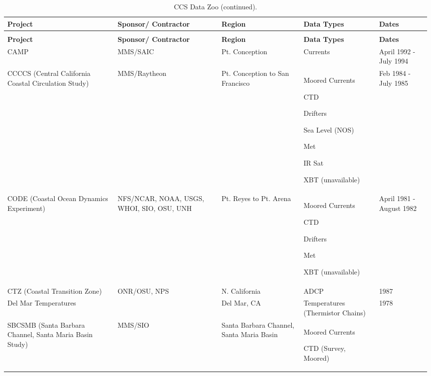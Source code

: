 \begin{longtable}{|p{0.75in}|p{0.75in}|p{1.0in}|p{1.25in}|p{0.75in}|}
  \caption{CCS Data Zoo.\label{II,table1}}
\\ \hline
\textbf{Project} & \textbf{Sponsor/ Contractor} & \textbf{Region} &
      \textbf{Data Types} &    \textbf{Dates} \\ \hline
\endfirsthead
\caption{CCS Data Zoo (continued).}
\\ \hline
\textbf{Project} & \textbf{Sponsor/ Contractor} & \textbf{Region} &
      \textbf{Data Types} &    \textbf{Dates} \\ \hline
\endhead
\hline
\endfoot
CAMP &
MMS/SAIC &
Pt. Conception &
Currents &
April 1992 - July 1994 \\ \hline
CCCCS (Central California Coastal Circulation Study) &
MMS/Ray\-theon &
Pt. Conception to 
San Francisco &
\begin{tablelist}
\item Moored Currents
\item CTD
\item Drifters
\item Sea Level (NOS)
\item Met
\item IR Sat 
\item XBT (unavailable) 
\end{tablelist} &
Feb 1984 - July 1985 \\ \hline
CODE (Coastal Ocean Dynamics Experiment) &
NFS/NCAR, NOAA, USGS, WHOI, SIO, OSU, UNH &
Pt. Reyes to Pt. Arena &
\begin{tablelist}
\item Moored Currents
\item CTD
\item Drifters
\item Met
\item XBT (unavailable)
\end{tablelist} &
April 1981 - August 1982 \\ \hline
CTZ (Coastal Transition Zone) &
ONR/OSU, NPS &
N. California &
ADCP &
1987 \\ \hline
Del Mar Temperatures &
&
Del Mar, CA &
Temperatures 
(Thermistor Chains) &
1978 \\ \hline
SBCSMB (Santa Barbara Channel, Santa Maria Basin Study) &
MMS/SIO &
Santa Barbara 
Channel, Santa 
Maria Basin &
\begin{tablelist}
\item Moored Currents
\item CTD (Survey, Moored)

\end{tablelist}
\end{longtable}
